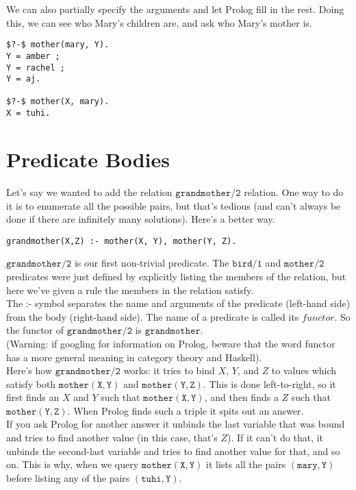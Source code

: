 \documentclass[a4paper,12pt]{article}
\newcommand{\kwa}[1]{\mathtt{#1}}
\begin{document}
\noindent
We can also partially specify the arguments and let Prolog fill in the rest. Doing this, we can see who Mary's children are, and ask who Mary's mother is.

\begin{lstlisting}
$?-$ mother(mary, Y).
Y = amber ;
Y = rachel ;
Y = aj.

$?-$ mother(X, mary).
X = tuhi.
\end{lstlisting}


\section{Predicate Bodies}

\noindent
Let's say we wanted to add the relation $\kwa{grandmother \slash 2}$ relation. One way to do it is to enumerate all the possible pairs, but that's tedious (and can't always be done if there are infinitely many solutions). Here's a better way.

\begin{lstlisting}
grandmother(X,Z) :- mother(X, Y), mother(Y, Z).
\end{lstlisting}

\noindent
$\kwa{grandmother \slash 2}$ is our first non-trivial predicate. The $\kwa{bird \slash 1}$ and $\kwa{mother \slash 2}$ predicates were just defined by explicitly listing the members of the relation, but here we've given a rule the members in the relation satisfy. \\

\noindent 
The :- symbol separates the name and arguments of the predicate (left-hand side) from the body (right-hand side). The name of a predicate is called its $\textit{functor}$. So the functor of $\kwa{grandmother \slash 2}$ is $\kwa{grandmother}$. \\

\noindent
(Warning: if googling for information on Prolog, beware that the word functor has a more general meaning in category theory and Haskell). \\

\noindent
Here's how $\kwa{grandmother \slash 2}$ works: it tries to bind $X$, $Y$, and $Z$ to values which satisfy both $\kwa{mother(X,Y)}$ and $\kwa{mother(Y,Z)}$. This is done left-to-right, so it first finds an $X$ and $Y$ such that $\kwa{mother(X,Y)}$, and then finds a $Z$ such that $\kwa{mother(Y,Z)}$. When Prolog finds such a triple it spits out an answer. \\

\noindent
If you ask Prolog for another answer it unbinds the last variable that was bound and tries to find another value (in this case, that's $Z$). If it can't do that, it unbinds the second-last variable and tries to find another value for that, and so on. This is why, when we query $\kwa{mother(X, Y)}$ it lists all the pairs $\kwa{(mary, Y)}$ before listing any of the pairs $\kwa{(tuhi, Y)}$.
\end{document}
